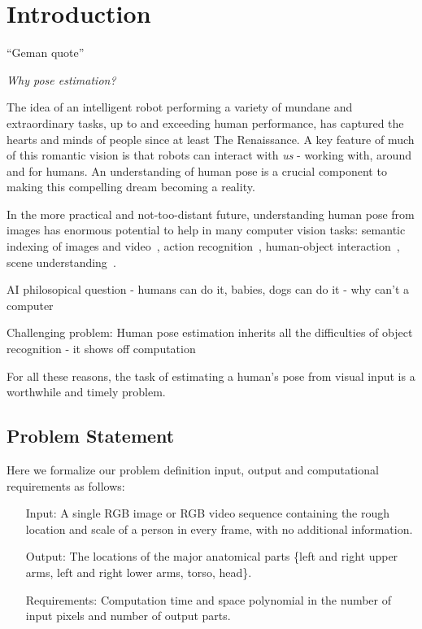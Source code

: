 \chapter{Introduction}

``Geman quote''

{\em Why pose estimation?}

The idea of an intelligent robot performing a variety of mundane and 
extraordinary tasks, up to and exceeding human performance, has captured the 
hearts and minds of people since at least The Renaissance.  A key feature of 
much of this romantic vision is that robots can interact with {\em us} - 
working with, around and for humans.  An understanding of human pose is a 
crucial component to making this compelling dream becoming a reality.  

In the more practical and not-too-distant future, understanding human pose from 
images has enormous potential to help in many computer vision tasks: semantic 
indexing of images and video~\citep{posesearch}, action 
recognition~\citep{pose-action11}, human-object interaction~\citep{bangpeng12}, 
scene understanding~\citep{gupta11}.   

AI philosopical question - humans can do it, babies,  dogs can do it - why 
can't a computer

Challenging problem: Human pose estimation inherits all the difficulties of 
object recognition - it shows off computation

For all these reasons, the task of estimating a human's pose from visual input 
is a worthwhile and timely problem.  



\section{Problem Statement}

Here we formalize our problem definition input, output and computational 
requirements as follows:  

\begin{problem}
\label{prob:pose}
\hspace*{\fill}
\begin{itemize}
 \item[Input:] A single RGB image or RGB video sequence containing the rough 
location and scale of a person in every frame, with no additional information.
\item[Output:] The locations of the major anatomical parts \{left and right 
upper arms, left and right lower arms, torso, head\}.
\item[Requirements:] Computation time and space polynomial in the number of 
input pixels and number of output parts.
\end{itemize}
\end{problem}

